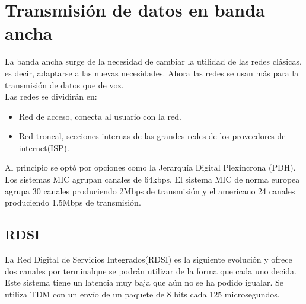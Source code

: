 \section{Transmisión de datos en banda ancha}
La banda ancha surge de la necesidad de cambiar la utilidad de las redes clásicas, es decir, adaptarse a las nuevas necesidades. Ahora las redes se usan más para la transmisión de datos que de voz.\\
Las redes se dividirán en:
\begin{itemize}
\item Red de acceso, conecta al usuario con la red.
\item Red troncal, secciones internas de las grandes redes de los proveedores de internet(ISP).
\end{itemize}
Al principio se optó por opciones como la Jerarquía Digital Plexincrona (PDH). Los sistemas MIC agrupan canales de 64kbps. El sistema MIC de norma europea agrupa 30 canales produciendo 2Mbps de transmisión y el americano 24 canales produciendo 1.5Mbps de transmisión.
\subsection{RDSI}
La Red Digital de Servicios Integrados(RDSI) es la siguiente evolución y ofrece dos canales por terminalque se podrán utilizar de la forma que cada uno decida. Este sistema tiene un latencia muy baja que aún no se ha podido igualar. Se utiliza TDM con un envío de un paquete de 8 bits cada 125 microsegundos.
